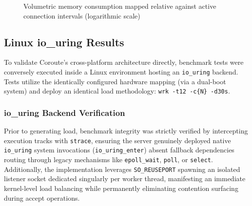 \begin{figure}[H]
\caption{Volumetric memory consumption mapped relative against active connection intervals (logarithmic scale)}
\label{fig:memory-chart}
\end{figure}

\subsection{Linux io\_uring Results}

To validate Coroute's cross-platform architecture directly, benchmark tests were conversely executed inside a Linux environment hosting an \texttt{io\_uring} backend. Tests utilize the identically configured hardware mapping (via a dual-boot system) and deploy an identical load methodology: \texttt{wrk -t12 -c\{N\} -d30s}.

\subsubsection{io\_uring Backend Verification}

Prior to generating load, benchmark integrity was strictly verified by intercepting execution tracks with \texttt{strace}, ensuring the server genuinely deployed native \texttt{io\_uring} system invocations (\texttt{io\_uring\_enter}) absent fallback dependencies routing through legacy mechanisms like \texttt{epoll\_wait}, \texttt{poll}, or \texttt{select}. Additionally, the implementation leverages \texttt{SO\_REUSEPORT} spawning an isolated listener socket dedicated singularly per worker thread, manifesting an immediate kernel-level load balancing while permanently eliminating contention surfacing during accept operations.

